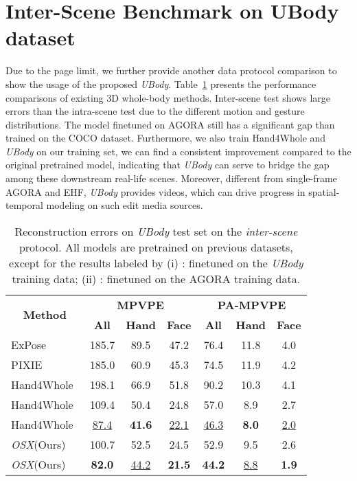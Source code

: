 \documentclass[10pt,twocolumn,letterpaper]{article}
\newcommand{\modelname}{\emph{OSX}\xspace}
\newcommand{\dataname}{\emph{UBody}\xspace}
\begin{document}
\section{Inter-Scene Benchmark on UBody dataset}
\label{sec:inter_bench}

Due to the page limit, we further provide another data protocol comparison to show the usage of the proposed \dataname. Table~\ref{tab:3d_smplx_results_sup} presents the performance comparisons of existing 3D whole-body methods. Inter-scene test shows large errors than the intra-scene test due to the different motion and gesture distributions.
The model finetuned on AGORA still has a significant gap than trained on the COCO dataset.
Furthermore, we also train Hand4Whole and \dataname on our training set, we can find a consistent improvement compared to the original pretrained model, indicating that \dataname can serve to bridge the gap among these downstream real-life scenes. 
Moreover, different from single-frame AGORA and EHF, \dataname provides videos, which can drive progress in spatial-temporal modeling on such edit media sources.

\begin{table}[h]
\centering
  \resizebox{\linewidth}{!}
{
    \begin{tabular}{l|ccc|ccc}
    \toprule
    \multicolumn{1}{c|}{\multirow{2}[4]{*}{\textbf{Method}}} & \multicolumn{3}{c|}{\boldmath{}\textbf{MPVPE }\unboldmath{}} & \multicolumn{3}{c}{\boldmath{}\textbf{PA-MPVPE }\unboldmath{}}\\
    \cmidrule{2-7}
    & \textbf{All} & \textbf{Hand} & \textbf{Face} & \textbf{All} & \textbf{Hand} & \textbf{Face} \\
    \midrule
ExPose~\cite{PavlakosGeorgios2020expose} &185.7 & 89.5 & 47.2 & 76.4 & 11.8 & 4.0 \\
PIXIE~\cite{Feng_2021_pixie} &185.0 & 60.9 & 45.3 & 74.5 & 11.9  & 4.2  \\
    Hand4Whole~\cite{GyeongsikMoon2020hand4whole} &198.1&	66.9	&51.8 & 90.2&	10.3&	4.1 \\
    Hand4Whole~\cite{GyeongsikMoon2020hand4whole} &109.4 & {50.4} & 24.8 & 57.0 & {8.9}  & 2.7 \\
    Hand4Whole~\cite{GyeongsikMoon2020hand4whole} &	\underline{87.4}&	\textbf{41.6}&	\underline{22.1}&\underline{46.3}&	\textbf{8.0}&\underline{2.0} \\
    
    \midrule
    \modelname (Ours) & {100.7} & 52.5  &{24.5} & {52.9}& 9.5 & {2.6}   \\
    \modelname (Ours) & \textbf{82.0}&	\underline{44.2}&	\textbf{21.5}&\textbf{44.2}&\underline{8.8}&	\textbf{1.9} \\
    \bottomrule
    \end{tabular}}
    \vspace{-0.2cm}
  \caption[Reconstruction errors on the proposed \dataname test set.]{Reconstruction errors on \dataname test set on the \emph{inter-scene} protocol. All models are pretrained on previous datasets, except for the results labeled by (i) : finetuned on the \dataname training data; (ii) : finetuned on the AGORA training data. }
  \label{tab:3d_smplx_results_sup}\end{table}
\end{document}
